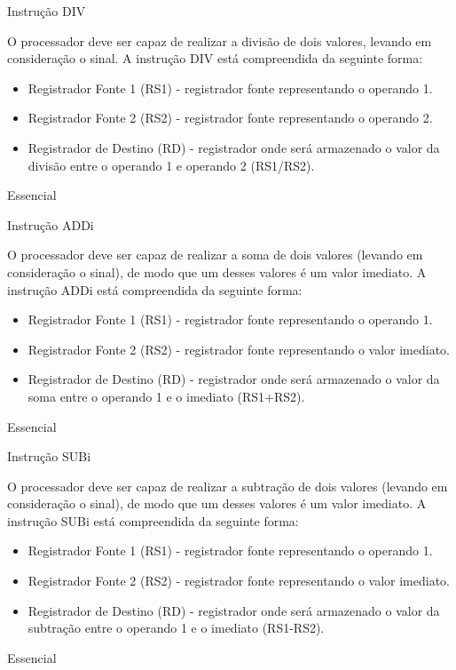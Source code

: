 \documentclass{article}
\begin{document}
\begin{functional}
       \requirement
      {Instrução DIV}
      {O processador deve ser capaz de realizar a divisão de dois valores, levando em consideração o sinal.
      A instrução DIV está compreendida da seguinte forma:\\
       \begin{itemize}
        \item Registrador Fonte 1 (RS1) - registrador fonte representando o operando 1.
        \item Registrador Fonte 2 (RS2) - registrador fonte representando o operando 2.
        \item Registrador de Destino (RD) - registrador onde será armazenado o valor da divisão entre o operando 1 e operando 2 (RS1/RS2).
       \end{itemize}
       }
      {Essencial}
      
      \requirement
      {Instrução ADDi}
      {O processador deve ser capaz de realizar a soma de dois valores (levando em consideração o sinal), de modo que um desses valores é um valor imediato. A instrução ADDi está compreendida da seguinte forma:\\
       \begin{itemize}
        \item Registrador Fonte 1 (RS1) - registrador fonte representando o operando 1.
        \item Registrador Fonte 2 (RS2) - registrador fonte representando o valor imediato.
        \item Registrador de Destino (RD) - registrador onde será armazenado o valor da soma entre o operando 1 e o imediato (RS1+RS2).
       \end{itemize}
       }
      {Essencial}
      
      \requirement
      {Instrução SUBi}
      {O processador deve ser capaz de realizar a subtração de dois valores (levando em consideração o sinal), de modo que um desses valores é um valor imediato. A instrução SUBi está compreendida da seguinte forma:\\
       \begin{itemize}
        \item Registrador Fonte 1 (RS1) - registrador fonte representando o operando 1.
        \item Registrador Fonte 2 (RS2) - registrador fonte representando o valor imediato.
        \item Registrador de Destino (RD) - registrador onde será armazenado o valor da subtração entre o operando 1 e o imediato (RS1-RS2).
       \end{itemize}
       }
      {Essencial}


\end{functional}
\end{document}
